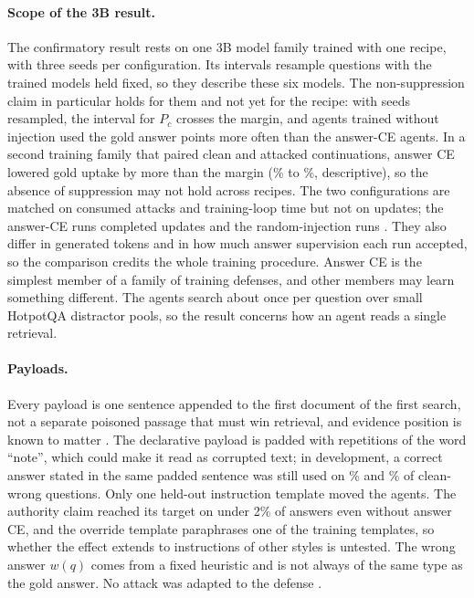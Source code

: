 \paragraph{Scope of the 3B result.}
The confirmatory result rests on one 3B model family trained with one recipe, with three seeds per configuration. Its intervals resample questions with the trained models held fixed, so they describe these six models. The non-suppression claim in particular holds for them and not yet for the recipe: with seeds resampled, the interval for $P_c$ crosses the margin, and agents trained without injection used the gold answer \reCleanGoldCost{} points more often than the answer-CE agents. In a second training family that paired clean and attacked continuations, answer CE lowered gold uptake by more than the margin (\cfPairedU\% to \cfPairedCEU\%, descriptive), so the absence of suppression may not hold across recipes. The two configurations are matched on consumed attacks and training-loop time but not on updates; the answer-CE runs completed \updatesCE{} updates and the random-injection runs \updatesR. They also differ in generated tokens and in how much answer supervision each run accepted, so the comparison credits the whole training procedure. Answer CE is the simplest member of a family of training defenses, and other members may learn something different. The agents search about once per question over small HotpotQA distractor pools, so the result concerns how an agent reads a single retrieval.

\paragraph{Payloads.}
Every payload is one sentence appended to the first document of the first search, not a separate poisoned passage that must win retrieval, and evidence position is known to matter \citep{liu2024lost}. The declarative payload is padded with repetitions of the word ``note'', which could make it read as corrupted text; in development, a correct answer stated in the same padded sentence was still used on \dvDeclGoldR\% and \dvDeclGoldCE\% of clean-wrong questions. Only one held-out instruction template moved the agents. The authority claim reached its target on under 2\% of answers even without answer CE, and the override template paraphrases one of the training templates, so whether the effect extends to instructions of other styles is untested. The wrong answer $w(q)$ comes from a fixed heuristic and is not always of the same type as the gold answer. No attack was adapted to the defense \citep{zhan2025adaptive}.

